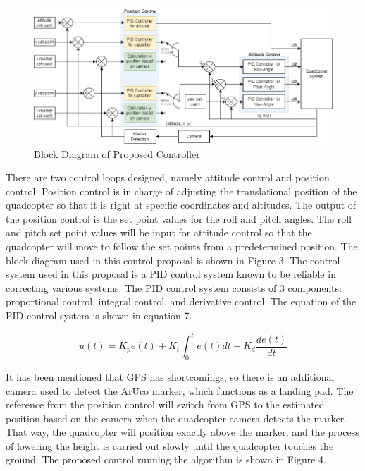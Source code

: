\documentclass[a4paper]{jpconf}
\begin{document}
\begin{figure}[h]
    \centering
    \includegraphics[width=30pc]{block-diagram-controller.png}
    \caption{\label{label}Block Diagram of Proposed Controller}
\end{figure}

There are two control loops designed, namely attitude control and position control. Position control is in charge of adjusting the translational position of the quadcopter so that it is right at specific coordinates and altitudes. The output of the position control is the set point values for the roll and pitch angles. The roll and pitch set point values will be input for attitude control so that the quadcopter will move to follow the set points from a predetermined position. The block diagram used in this control proposal is shown in Figure 3. The control system used in this proposal is a PID control system known to be reliable in correcting various systems. The PID control system consists of 3 components: proportional control, integral control, and derivative control. The equation of the PID control system is shown in equation 7\cite{ref13}.

\begin{equation}
    u(t)=K_{p}e(t)+K_{i}\int_{0}^{t}e(t)dt+K_{d}\frac{de(t)}{dt}
\end{equation}

It has been mentioned that GPS has shortcomings, so there is an additional camera used to detect the ArUco marker, which functions as a landing pad. The reference from the position control will switch from GPS to the estimated position based on the camera when the quadcopter camera detects the marker. That way, the quadcopter will position exactly above the marker, and the process of lowering the height is carried out slowly until the quadcopter touches the ground. The proposed control running the algorithm is shown in Figure 4.
\end{document}
